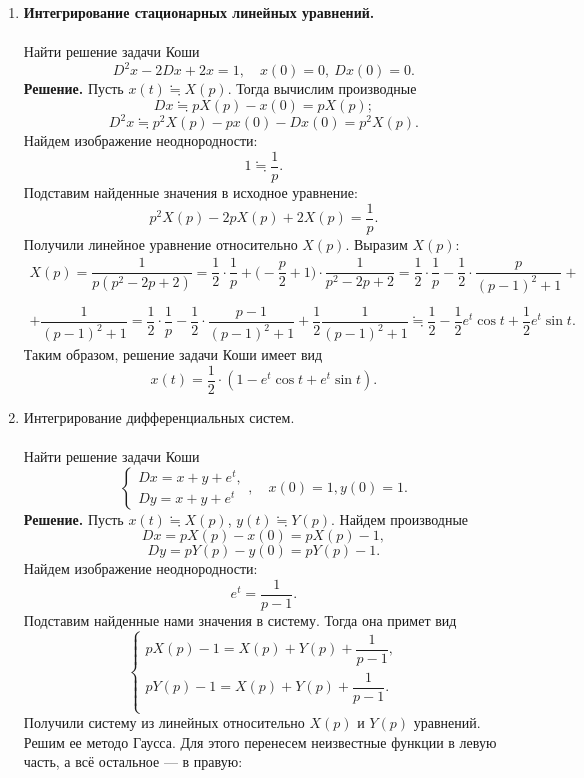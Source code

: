 \documentclass[a4paper, 12pt]{article}
\begin{document}
	\begin{enumerate}
		\item \textbf{Интегрирование стационарных линейных уравнений.}\\\\
		Найти решение задачи Коши $$D^2x - 2Dx + 2x = 1,\quad x(0) = 0,\ Dx(0) = 0.$$
		\textbf{Решение.} Пусть $x(t) \fallingdotseq X(p)$. Тогда вычислим производные $$Dx \fallingdotseq pX(p) - x(0) = pX(p);$$
		$$D^2x \fallingdotseq p^2X(p) - px(0) - Dx(0) = p^2X(p).$$
		Найдем изображение неоднородности:
		$$1 \fallingdotseq \dfrac{1}{p}.$$
		Подставим найденные значения в исходное уравнение:
		$$p^2X(p) - 2pX(p) + 2X(p) = \dfrac{1}{p}.$$
		Получили линейное уравнение относительно $X(p)$. Выразим $X(p)$:
		\begin{multline*}
		X(p) = \dfrac{1}{p(p^2 - 2p + 2)} = \dfrac{1}{2}\cdot \dfrac{1}{p} + \Big(-\dfrac{p}{2} + 1\Big)\cdot \dfrac{1}{p^2 - 2p + 2} = \dfrac{1}{2}\cdot \dfrac{1}{p} - \dfrac{1}{2}\cdot \dfrac{p}{(p-1)^2 + 1} +\\\\+ \dfrac{1}{(p-1)^2 + 1}  = \dfrac{1}{2}\cdot \dfrac{1}{p} - \dfrac{1}{2}\cdot \dfrac{p - 1}{(p-1)^2 + 1} + \dfrac{1}{2}\dfrac{1}{(p-1)^2 + 1} \fallingdotseq \dfrac{1}{2} - \dfrac{1}{2}e^t\cos t + \dfrac{1}{2}e^t\sin t.
 		\end{multline*}
		Таким образом, решение задачи Коши имеет вид $$x(t) = \dfrac{1}{2}\cdot (1 - e^t\cos t + e^t\sin t).$$
		\item Интегрирование дифференциальных систем.\\\\
		Найти решение задачи Коши $$\begin{cases}
			Dx = x + y + e^t,\\
			Dy = x + y + e^t
		\end{cases}, \quad x(0) = 1, y(0)=1.$$
		\textbf{Решение.} Пусть $x(t) \fallingdotseq X(p)$, $y(t) \fallingdotseq Y(p)$. Найдем производные $$Dx = pX(p) - x(0) = pX(p) - 1,$$
		$$Dy = pY(p)  - y(0) = pY(p) - 1.$$
		Найдем изображение неоднородности:
		$$e^t = \dfrac{1}{p -1}.$$
		Подставим найденные нами значения в систему. Тогда она примет вид $$\begin{cases}
			pX(p) - 1 = X(p) + Y(p) + \dfrac{1}{p -1},\\
			pY(p) - 1 = X(p) + Y(p) + \dfrac{1}{p -1}.\\
		\end{cases}$$
		Получили систему из линейных относительно $X(p)$ и $Y(p)$ уравнений. Решим ее методо Гаусса. Для этого перенесем неизвестные функции в левую часть, а всё остальное --- в правую:

\end{enumerate}
\end{document}

